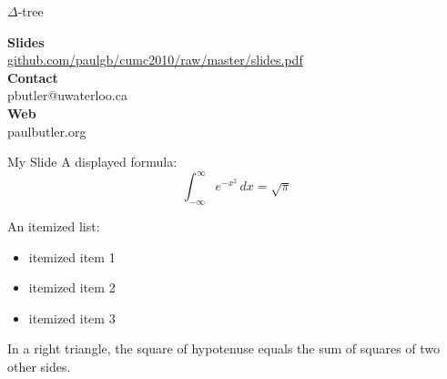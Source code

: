 \documentclass{beamer}
\theoremstyle{definition}
\theoremstyle{definition}
\begin{document}
\begin{frame}{$\Delta$-tree}

\end{frame}

\begin{frame}
{}

\end{frame}


\begin{frame}
\textbf{Slides} \\
\url{github.com/paulgb/cumc2010/raw/master/slides.pdf} \\
\vspace{1.5em}
\textbf{Contact} \\
pbutler@uwaterloo.ca \\
\vspace{1.5em}
\textbf{Web} \\
paulbutler.org
\end{frame}

\begin{frame}{My Slide}
A displayed formula:
\[
    \int_{-\infty}^\infty e^{-x^2} \, dx = \sqrt{\pi}
\]

An itemized list:
\begin{itemize}
    \item itemized item 1
    \item itemized item 2
    \item itemized item 3
\end{itemize}

\begin{theorem}
    In a right triangle, the square of hypotenuse equals
    the sum of squares of two other sides.
\end{theorem}

\end{frame}
\end{document}
